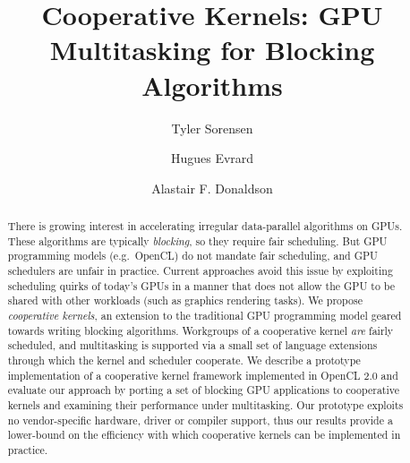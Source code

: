 \documentclass[sigconf]{acmart}
\begin{document}
\title{Cooperative Kernels: GPU Multitasking for Blocking Algorithms}

\author{Tyler Sorensen}

\author{Hugues Evrard}


\author{Alastair F. Donaldson}



\begin{abstract}
There is growing interest in accelerating irregular data-parallel
algorithms on GPUs.  These algorithms are typically \emph{blocking},
so they require fair scheduling.  But GPU programming models
(e.g.\ OpenCL) do not mandate fair scheduling, and GPU schedulers are
unfair in practice.  Current approaches avoid this issue by exploiting
scheduling quirks of today's GPUs in a manner that does not allow the
GPU to be shared with other workloads (such as graphics rendering
tasks).  We propose \emph{cooperative kernels}, an extension to the
traditional GPU programming model geared towards writing blocking
algorithms.  Workgroups of a cooperative kernel \emph{are} fairly
scheduled, and multitasking is supported via a small set of language
extensions through which the kernel and scheduler cooperate.  We
describe a prototype implementation of a cooperative kernel framework
implemented in OpenCL 2.0 and evaluate our approach by porting a set
of blocking GPU applications to cooperative kernels and examining
their performance under multitasking.  Our prototype exploits no
vendor-specific hardware, driver or compiler support, thus our results
provide a lower-bound on the efficiency with which cooperative kernels
can be implemented in practice.

\end{abstract}


%
%



\end{document}
